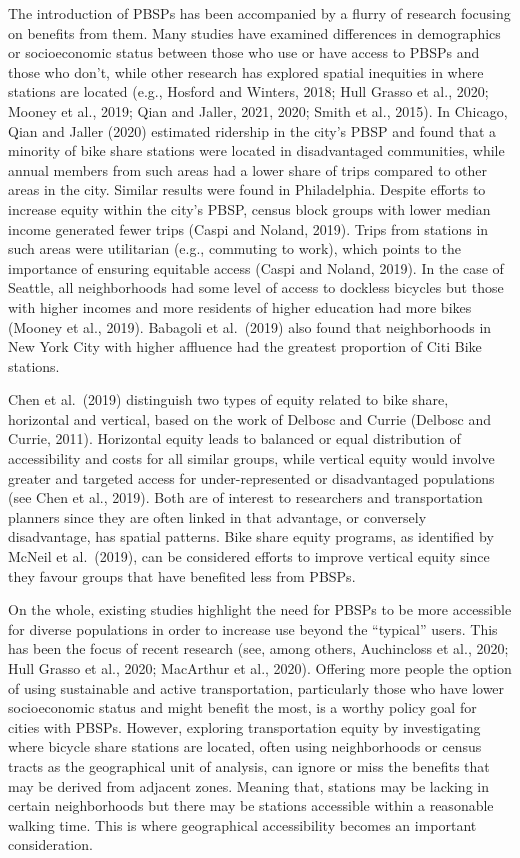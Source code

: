 \documentclass[]{elsarticle} %
\begin{document}
The introduction of PBSPs has been accompanied by a flurry of research
focusing on benefits from them. Many studies have examined differences
in demographics or socioeconomic status between those who use or have
access to PBSPs and those who don't, while other research has explored
spatial inequities in where stations are located (e.g., Hosford and
Winters, 2018; Hull Grasso et al., 2020; Mooney et al., 2019; Qian and
Jaller, 2021, 2020; Smith et al., 2015). In Chicago, Qian and Jaller
(2020) estimated ridership in the city's PBSP and found that a minority
of bike share stations were located in disadvantaged communities, while
annual members from such areas had a lower share of trips compared to
other areas in the city. Similar results were found in Philadelphia.
Despite efforts to increase equity within the city's PBSP, census block
groups with lower median income generated fewer trips (Caspi and Noland,
2019). Trips from stations in such areas were utilitarian (e.g.,
commuting to work), which points to the importance of ensuring equitable
access (Caspi and Noland, 2019). In the case of Seattle, all
neighborhoods had some level of access to dockless bicycles but those
with higher incomes and more residents of higher education had more
bikes (Mooney et al., 2019). Babagoli et al.~(2019) also found that
neighborhoods in New York City with higher affluence had the greatest
proportion of Citi Bike stations.

Chen et al.~(2019) distinguish two types of equity related to bike
share, horizontal and vertical, based on the work of Delbosc and Currie
(Delbosc and Currie, 2011). Horizontal equity leads to balanced or equal
distribution of accessibility and costs for all similar groups, while
vertical equity would involve greater and targeted access for
under-represented or disadvantaged populations (see Chen et al., 2019).
Both are of interest to researchers and transportation planners since
they are often linked in that advantage, or conversely disadvantage, has
spatial patterns. Bike share equity programs, as identified by McNeil et
al.~(2019), can be considered efforts to improve vertical equity since
they favour groups that have benefited less from PBSPs.

On the whole, existing studies highlight the need for PBSPs to be more
accessible for diverse populations in order to increase use beyond the
``typical'' users. This has been the focus of recent research (see,
among others, Auchincloss et al., 2020; Hull Grasso et al., 2020;
MacArthur et al., 2020). Offering more people the option of using
sustainable and active transportation, particularly those who have lower
socioeconomic status and might benefit the most, is a worthy policy goal
for cities with PBSPs. However, exploring transportation equity by
investigating where bicycle share stations are located, often using
neighborhoods or census tracts as the geographical unit of analysis, can
ignore or miss the benefits that may be derived from adjacent zones.
Meaning that, stations may be lacking in certain neighborhoods but there
may be stations accessible within a reasonable walking time. This is
where geographical accessibility becomes an important consideration.
\end{document}
